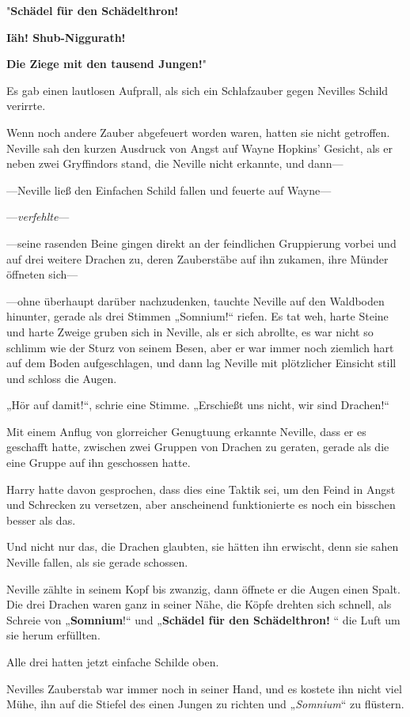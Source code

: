 {"\textbf{Schädel für den Schädelthron!}

\textbf{Iäh! Shub-Niggurath!}

\textbf{Die Ziege mit den tausend Jungen!}"

Es gab einen lautlosen Aufprall, als sich ein Schlafzauber gegen Nevilles Schild verirrte.

Wenn noch andere Zauber abgefeuert worden waren, hatten sie nicht getroffen. Neville sah den kurzen Ausdruck von Angst auf Wayne Hopkins' Gesicht, als er neben zwei Gryffindors stand, die Neville nicht erkannte, und dann—

—Neville ließ den Einfachen Schild fallen und feuerte auf Wayne—

—\emph{verfehlte}—

—seine rasenden Beine gingen direkt an der feindlichen Gruppierung vorbei und auf drei weitere Drachen zu, deren Zauberstäbe auf ihn zukamen, ihre Münder öffneten sich—

—ohne überhaupt darüber nachzudenken, tauchte Neville auf den Waldboden hinunter, gerade als drei Stimmen „Somnium!“ riefen. Es tat weh, harte Steine und harte Zweige gruben sich in Neville, als er sich abrollte, es war nicht so schlimm wie der Sturz von seinem Besen, aber er war immer noch ziemlich hart auf dem Boden aufgeschlagen, und dann lag Neville mit plötzlicher Einsicht still und schloss die Augen.

„Hör auf damit!“, schrie eine Stimme. „Erschießt uns nicht, wir sind Drachen!“

Mit einem Anflug von glorreicher Genugtuung erkannte Neville, dass er es geschafft hatte, zwischen zwei Gruppen von Drachen zu geraten, gerade als die eine Gruppe auf ihn geschossen hatte.

Harry hatte davon gesprochen, dass dies eine Taktik sei, um den Feind in Angst und Schrecken zu versetzen, aber anscheinend funktionierte es noch ein bisschen besser als das.

Und nicht nur das, die Drachen glaubten, sie hätten ihn erwischt, denn sie sahen Neville fallen, als sie gerade schossen.

Neville zählte in seinem Kopf bis zwanzig, dann öffnete er die Augen einen Spalt. Die drei Drachen waren ganz in seiner Nähe, die Köpfe drehten sich schnell, als Schreie von „\textbf{Somnium}!“ und „\textbf{Schädel für den Schädelthron!} “ die Luft um sie herum erfüllten.

Alle drei hatten jetzt einfache Schilde oben.

Nevilles Zauberstab war immer noch in seiner Hand, und es kostete ihn nicht viel Mühe, ihn auf die Stiefel des einen Jungen zu richten und „\emph{Somnium}“ zu flüstern.

}
